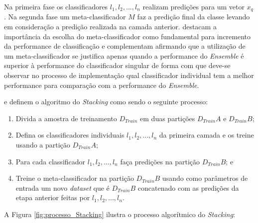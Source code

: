 Na primeira fase os classificadores $l_1, l_2, ..., l_n$ realizam predições para um vetor $x_q$. Na segunda fase um meta-classificador $M$ faz a predição final da classe levando em consideração a predição realizada na camada anterior.  destacam a importância da escolha do meta-classificador como fundamental para incremento da performance de classificação e  complementam afirmando que a utilização de um meta-classificador se justifica apenas quando a performance do \textit{Ensemble} é superior à performance do classificador singular de forma com que deve-se observar no processo de implementação qual classificador individual tem a melhor performance para comparação com a performance do \textit{Ensemble}.

 e  definem o algoritmo do \textit{Stacking} como sendo o seguinte processo:

\begin{enumerate}
    
    \item Divida a amostra de treinamento $D_{Train}$ em duas partições $D_{Train}A$ e $D_{Train}B$;
    
    \item Defina os classificadores individuais $l_1, l_2, ..., l_n$ da primeira camada e os treine usando a partição $D_{Train}A$;
    
    \item Para cada classificador $l_1, l_2, ..., l_n$ faça predições na partição $D_{Train}B$; e
    
    \item Treine o meta-classificador na partição $D_{Train}B$ usando como parâmetros de entrada um novo \textit{dataset} que é $D_{Train}B$ concatenado com as predições da etapa anterior feitas por $l_1, l_2, ..., l_n$.

\end{enumerate}
    
A Figura \ref{fig:processo_Stacking} ilustra o processo algorítmico do \textit{Stacking}:

